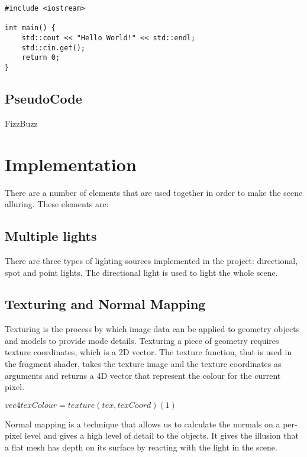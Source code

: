 \documentclass[10pt, a4paper]{article}
\begin{document}
\begin{lstlisting}[caption = Hello World! in c++]
#include <iostream>

int main() {
    std::cout << "Hello World!" << std::endl;
    std::cin.get();
    return 0;
}
\end{lstlisting}


    
\subsection{PseudoCode}

\begin{algorithm}[h]
\caption{FizzBuzz}
\end{algorithm}
	\section{Implementation}
		
	There are a number of elements that are used together in order to make the scene alluring. These elements are:

	\subsection{Multiple lights}
	There are three types of lighting sources implemented in the project: directional, spot and point lights. The directional light is used to light the whole scene.
	\subsection{Texturing and Normal Mapping}
	Texturing is the process by which image data can be applied to geometry objects and models to provide mode details. Texturing a piece of geometry requires texture coordinates, which is a 2D vector. The texture function, that is used in the fragment shader, takes the texture image and the texture coordinates as arguments and returns a 4D vector that represent the colour for the current pixel.
    \begin{center}{ \(vec4 texColour = texture(tex, texCoord) 	(1) \)}\end{center}
    Normal mapping is a technique that allows us to calculate the normals on a per-pixel level and gives a high level of detail to the objects. It gives the illusion that a flat mesh has depth on its surface by reacting with the light in the scene.
\end{document}
